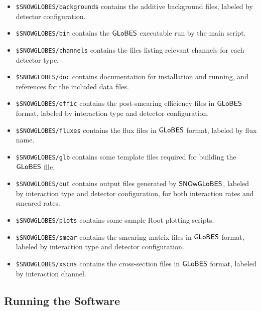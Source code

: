 \documentclass[12pt]{article}
\newcommand{\globes}{\sf{GLoBES}}
\newcommand{\snowglobes}{\sf{SNOwGLoBES}}
\begin{document}
\begin{itemize}

\item \texttt{\$SNOWGLOBES/backgrounds}  contains the additive background files, labeled by detector configuration.


\item \texttt{\$SNOWGLOBES/bin}  contains the $\globes$ executable run by the main script.

\item \texttt{\$SNOWGLOBES/channels}  contains the
files listing relevant channels for each detector type.

\item \texttt{\$SNOWGLOBES/doc}  contains documentation for installation and running, and references for the included data files.


\item \texttt{\$SNOWGLOBES/effic}  contains the
 post-smearing efficiency files in $\globes$ format, labeled by interaction type and detector configuration.

\item \texttt{\$SNOWGLOBES/fluxes}  contains the flux files in $\globes$ format, labeled by flux name.

\item \texttt{\$SNOWGLOBES/glb}  contains some template files required for building the $\globes$ file.

\item \texttt{\$SNOWGLOBES/out} contains output files generated by
  $\snowglobes$, labeled by interaction type and detector configuration,
  for both interaction rates and smeared rates.

\item \texttt{\$SNOWGLOBES/plots} contains some sample Root plotting scripts.

\item \texttt{\$SNOWGLOBES/smear}  contains the smearing matrix files in $\globes$ format, labeled by interaction type and detector configuration.

\item \texttt{\$SNOWGLOBES/xscns}  contains the cross-section files in $\globes$ format, labeled by interaction channel.



\end{itemize}


\subsection{Running the Software}
\end{document}
